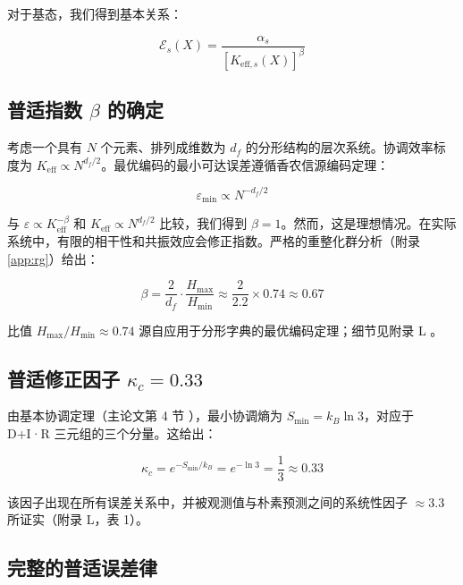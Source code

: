 \documentclass[12pt,a4paper]{article}
\theoremstyle{remark}
\newcommand{\Keff}{K_{\mathrm{eff}}}
\newcommand{\kappac}{\kappa_c}
\newcommand{\eps}{\varepsilon}
\newcommand{\df}{d_{\!f}}
\begin{document}
	对于基态，我们得到基本关系：
	
	\begin{equation}
		\mathcal{E}_s(X) = \frac{\alpha_s}{[K_{\mathrm{eff},s}(X)]^{\beta}}
		\label{eq:error-ground}
	\end{equation}
	
	\subsection{普适指数 $\beta$ 的确定}
	
	考虑一个具有 $N$ 个元素、排列成维数为 $\df$ 的分形结构的层次系统。协调效率标度为 $\Keff \propto N^{\df/2}$。最优编码的最小可达误差遵循香农信源编码定理：
	
	\begin{equation}
		\eps_{\min} \propto N^{-\df/2}
		\label{eq:shannon-bound}
	\end{equation}
	
	与 $\eps \propto \Keff^{-\beta}$ 和 $\Keff \propto N^{\df/2}$ 比较，我们得到 $\beta = 1$。然而，这是理想情况。在实际系统中，有限的相干性和共振效应会修正指数。严格的重整化群分析（附录 \ref{app:rg}）给出：
	
	\begin{equation}
		\beta = \frac{2}{\df} \cdot \frac{H_{\max}}{H_{\min}} \approx \frac{2}{2.2} \times 0.74 \approx 0.67
		\label{eq:beta-derivation}
	\end{equation}
	
	比值 $H_{\max}/H_{\min} \approx 0.74$ 源自应用于分形字典的最优编码定理；细节见附录 L \cite{AppendixL}。
	
	\subsection{普适修正因子 $\kappac = 0.33$}
	
	由基本协调定理（主论文第 4 节 \cite{Yakushev2026a}），最小协调熵为 $S_{\min} = k_B \ln 3$，对应于 D+I·R 三元组的三个分量。这给出：
	
	\begin{equation}
		\kappac = e^{-S_{\min}/k_B} = e^{-\ln 3} = \frac{1}{3} \approx 0.33
		\label{eq:kappac-derivation}
	\end{equation}
	
	该因子出现在所有误差关系中，并被观测值与朴素预测之间的系统性因子 $\approx 3.3$ 所证实（附录 L，表 1）。
	
	\subsection{完整的普适误差律}
	
\end{document}
